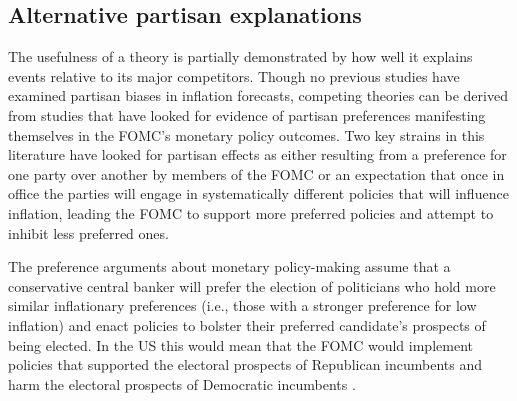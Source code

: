 \documentclass[a4paper]{article}
\begin{document}

\subsection{Alternative partisan explanations}

The usefulness of a theory is partially demonstrated by how well it explains events relative to its major competitors. Though no previous studies have examined partisan biases in inflation forecasts, competing theories can be derived from studies that have looked for evidence of partisan preferences manifesting themselves in the FOMC's monetary policy outcomes. Two key strains in this literature have looked for partisan effects as either resulting from a preference for one party over another by members of the FOMC or an expectation that once in office the parties will engage in systematically different policies that will influence inflation, leading the FOMC to support more preferred policies and attempt to inhibit less preferred ones. 

The preference arguments about monetary policy-making assume that a conservative central banker will prefer the election of politicians who hold more similar inflationary preferences (i.e., those with a stronger preference for low inflation) and enact policies to bolster their preferred candidate's prospects of being elected. In the US this would mean that the FOMC would implement policies that supported the electoral prospects of Republican incumbents and harm the electoral prospects of Democratic incumbents \citep{Clark2012,Hakes1988,Sieg1997,Tootell1996}.
\end{document}
